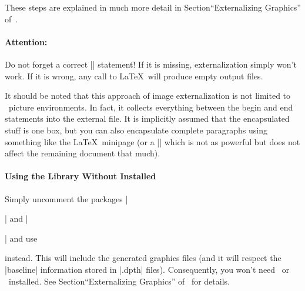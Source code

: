 {\begin{pgfgraphicnamed}
These steps are explained in much more detail in Section``Externalizing Graphics'' of~\cite{tikz}.

\paragraph{Attention:} Do not forget a correct |\pgfrealjobname| statement! If it is missing, externalization simply won't work. If it is wrong, any call to \LaTeX\ will produce empty output files.

It should be noted that this approach of image externalization is not limited to \Tikz\ picture environments. In fact, it collects everything between the begin and end statements into the external file. It is implicitly assumed that the encapsulated stuff is one box, but you can also encapsulate complete paragraphs using something like the \LaTeX\ minipage (or a |\vbox| which is not as powerful but does not affect the remaining document that much).


\paragraph{Using the Library Without {\normalfont\pgfname} Installed}
Simply uncomment the packages |\usepackage{tikz}| and |\usepackage{pgfplots}| and use
\begin{codeexample}
\long{}
\end{codeexample}
instead. This will include the generated graphics files (and it will respect the |baseline| information stored in |.dpth| files). Consequently, you won't need \pgfname\ or \PGFPlots\ installed. See Section``Externalizing Graphics'' of~\cite{tikz} for details.


\end{pgfgraphicnamed}}
